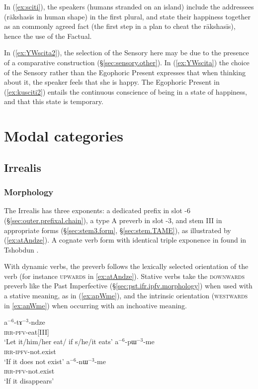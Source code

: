 In (\ref{ex:sciti}), the speakers (humans stranded on an island) include the addressees (rākshasīs in human shape) in the first plural, and state their happiness together as an commonly agreed fact (the first step in a plan to cheat the rākshasīs), hence the use of the Factual. 

In (\ref{ex:YWscita2}), the selection of the Sensory here may be due to the presence of a comparative construction (§\ref{sec:sensory.other}). In (\ref{ex:YWscita}) the choice of the Sensory rather than the Egophoric Present expresses that when thinking about it, the speaker feels that she is happy. The Egophoric Present in (\ref{ex:kusciti2}) entails the continuous conscience of being in a state of happiness, and that this state is temporary.

\section{Modal categories} \label{sec:TAME.modal}
\subsection{Irrealis} \label{sec:irrealis}
\subsubsection{Morphology} \label{sec:irrealis.morphology}
The Irrealis has three exponents: a dedicated prefix  in slot -6 (§\ref{sec:outer.prefixal.chain}), a type A preverb in slot -3, and stem III in appropriate forms (§\ref{sec:stem3.form}, §\ref{sec:stem.TAME}), as illustrated by (\ref{ex:atAndze}). A cognate verb form with identical triple exponence in found in Tshobdun \citep{jackson07irrealis}.

With dynamic verbs, the preverb follows the lexically selected orientation of the verb (for instance  \textsc{upwards} in \ref{ex:atAndze}). Stative verbs take the \textsc{downwards}  preverb like the Past Imperfective (§\ref{sec:pst.ifr.ipfv.morphology}) when used with a stative meaning, as in (\ref{ex:apWme}), and the intrinsic orientation (\textsc{westwards} in \ref{ex:anWme}) when occurring with an inchoative meaning.

\begin{exe}
\ex 
\begin{xlist}
\ex \label{ex:atAndze}
\gll a$^{-6}$-tɤ$^{-3}$-ndze \\
\textsc{irr}-\textsc{pfv}-eat[III] \\
\glt `Let it/him/her eat/ if s/he/it eats'
\ex \label{ex:apWme}
\gll a$^{-6}$-pɯ$^{-3}$-me \\
 \textsc{irr}-\textsc{ipfv}-not.exist \\
 \glt `If it does not exist'
\ex \label{ex:anWme}
\gll a$^{-6}$-nɯ$^{-3}$-me \\
 \textsc{irr}-\textsc{pfv}-not.exist \\
 \glt `If it disappears'
\end{xlist}
\end{exe}

